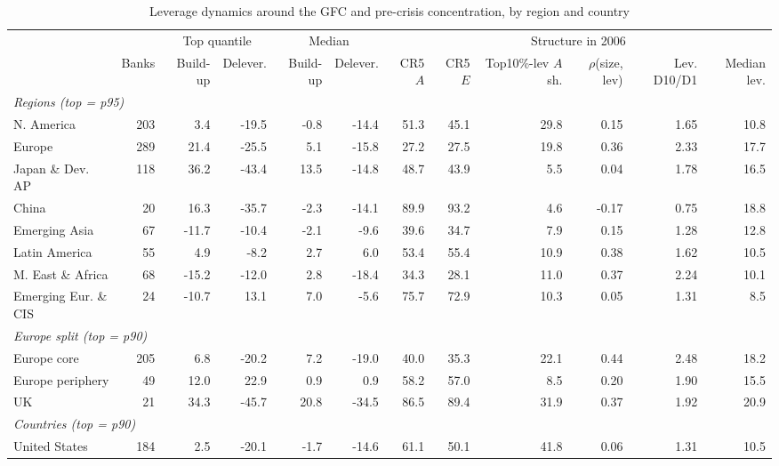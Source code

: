 \documentclass[11pt]{article}
\begin{document}
\begin{table}[htbp]
\centering
\footnotesize
\begin{threeparttable}
\caption{Leverage dynamics around the GFC and pre-crisis concentration, by region and country}
\label{tab:region_gfc}
\setlength{\tabcolsep}{4pt}
\begin{tabular}{lrrrrrrrrrrr}
\toprule
 & & \multicolumn{2}{c}{Top quantile} & \multicolumn{2}{c}{Median} & \multicolumn{6}{c}{Structure in 2006} \\
\cmidrule(lr){3-4}\cmidrule(lr){5-6}\cmidrule(lr){7-12}
 & Banks & Build-up & Delever. & Build-up & Delever. & CR5 $A$ & CR5 $E$ & Top10\%-lev $A$ sh. & $\rho$(size, lev) & Lev. D10/D1 & Median lev. \\
\midrule
\multicolumn{12}{l}{\textit{Regions (top = p95)}} \\
N. America & 203 & 3.4 & -19.5 & -0.8 & -14.4 & 51.3 & 45.1 & 29.8 & 0.15 & 1.65 & 10.8 \\
Europe & 289 & 21.4 & -25.5 & 5.1 & -15.8 & 27.2 & 27.5 & 19.8 & 0.36 & 2.33 & 17.7 \\
Japan \& Dev. AP & 118 & 36.2 & -43.4 & 13.5 & -14.8 & 48.7 & 43.9 & 5.5 & 0.04 & 1.78 & 16.5 \\
China & 20 & 16.3 & -35.7 & -2.3 & -14.1 & 89.9 & 93.2 & 4.6 & -0.17 & 0.75 & 18.8 \\
Emerging Asia & 67 & -11.7 & -10.4 & -2.1 & -9.6 & 39.6 & 34.7 & 7.9 & 0.15 & 1.28 & 12.8 \\
Latin America & 55 & 4.9 & -8.2 & 2.7 & 6.0 & 53.4 & 55.4 & 10.9 & 0.38 & 1.62 & 10.5 \\
M. East \& Africa & 68 & -15.2 & -12.0 & 2.8 & -18.4 & 34.3 & 28.1 & 11.0 & 0.37 & 2.24 & 10.1 \\
Emerging Eur. \& CIS & 24 & -10.7 & 13.1 & 7.0 & -5.6 & 75.7 & 72.9 & 10.3 & 0.05 & 1.31 & 8.5 \\
\multicolumn{12}{l}{\textit{Europe split (top = p90)}} \\
Europe core & 205 & 6.8 & -20.2 & 7.2 & -19.0 & 40.0 & 35.3 & 22.1 & 0.44 & 2.48 & 18.2 \\
Europe periphery & 49 & 12.0 & 22.9 & 0.9 & 0.9 & 58.2 & 57.0 & 8.5 & 0.20 & 1.90 & 15.5 \\
UK & 21 & 34.3 & -45.7 & 20.8 & -34.5 & 86.5 & 89.4 & 31.9 & 0.37 & 1.92 & 20.9 \\
\multicolumn{12}{l}{\textit{Countries (top = p90)}} \\
United States & 184 & 2.5 & -20.1 & -1.7 & -14.6 & 61.1 & 50.1 & 41.8 & 0.06 & 1.31 & 10.5 \\

\end{tabular}
\end{threeparttable}
\end{table}
\end{document}
